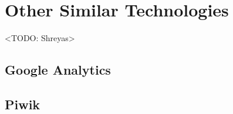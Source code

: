 \section{Other Similar Technologies}
<TODO: Shreyas>

\subsection{Google Analytics}

\subsection{Piwik}

